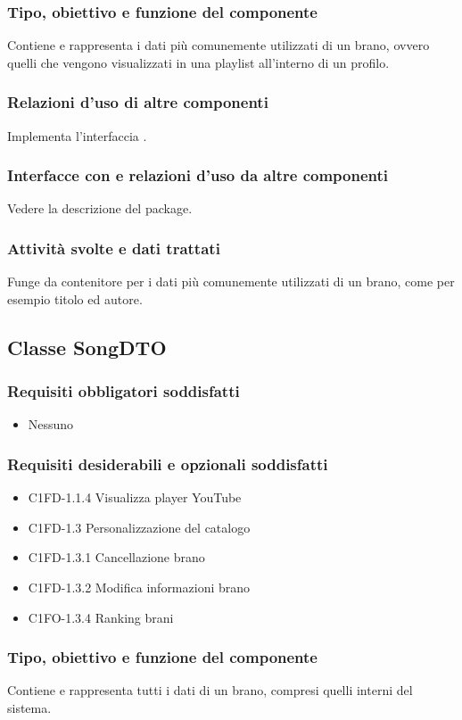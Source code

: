 \subsubsection*{Tipo, obiettivo e funzione del componente}
Contiene e rappresenta i dati pi\`u comunemente utilizzati di un brano, ovvero
quelli che vengono visualizzati in una playlist all'interno di un profilo.
\subsubsection*{Relazioni d'uso di altre componenti}
Implementa l'interfaccia .
\subsubsection*{Interfacce con e relazioni d'uso da altre componenti}
Vedere la descrizione del package.
\subsubsection*{Attivit\`a svolte e dati trattati}
Funge da contenitore per i dati pi\`u comunemente utilizzati di un brano, come
per esempio titolo ed autore.

\subsection{Classe SongDTO}
\subsubsection*{Requisiti obbligatori soddisfatti}
\begin{itemize}
    \item Nessuno
\end{itemize}
\subsubsection*{Requisiti desiderabili e opzionali soddisfatti}
\begin{itemize}
    \item C1FD-1.1.4 Visualizza player YouTube
    \item C1FD-1.3 Personalizzazione del catalogo
    \item C1FD-1.3.1 Cancellazione brano
    \item C1FD-1.3.2 Modifica informazioni brano
    \item C1FO-1.3.4 Ranking brani
\end{itemize}
\subsubsection*{Tipo, obiettivo e funzione del componente}
Contiene e rappresenta tutti i dati di un brano, compresi quelli interni del
sistema. 

